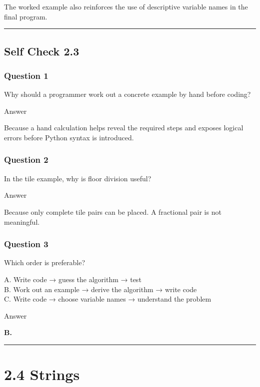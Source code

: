 \documentclass[
]{article}
\begin{document}
The worked example also reinforces the use of descriptive variable names
in the final program.

\begin{center}\rule{0.5\linewidth}{0.5pt}\end{center}

\subsection{Self Check 2.3}\label{self-check-2.3}

\subsubsection{Question 1}\label{question-1-2}

Why should a programmer work out a concrete example by hand before
coding?

Answer

Because a hand calculation helps reveal the required steps and exposes
logical errors before Python syntax is introduced.

\subsubsection{Question 2}\label{question-2-2}

In the tile example, why is floor division useful?

Answer

Because only complete tile pairs can be placed. A fractional pair is not
meaningful.

\subsubsection{Question 3}\label{question-3-2}

Which order is preferable?

A. Write code → guess the algorithm → test\\
B. Work out an example → derive the algorithm → write code\\
C. Write code → choose variable names → understand the problem

Answer

\textbf{B.}

\begin{center}\rule{0.5\linewidth}{0.5pt}\end{center}

\section{2.4 Strings}\label{strings}
\end{document}
